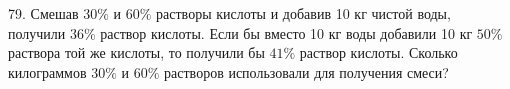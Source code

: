 79. Смешав $30\%$ и $60\%$ растворы кислоты и добавив 10 кг чистой воды, получили $36\%$ раствор кислоты. Если бы вместо 10 кг воды добавили 10 кг $50\%$ раствора той же кислоты, то получили бы $41\%$ раствор кислоты. Сколько килограммов $30\%$ и $60\%$ растворов использовали для получения смеси?\\
